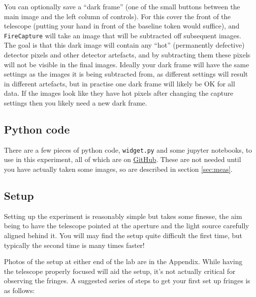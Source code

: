 \documentclass[11pt]{article}
\begin{document}
You can optionally save a ``dark frame'' (one of the small buttons between the main image and the left column of controls). For this cover the front of the telescope (putting your hand in front of the baseline token would suffice), and \texttt{FireCapture} will take an image that will be subtracted off subsequent images. The goal is that this dark image will contain any ``hot'' (permanently defective) detector pixels and other detector artefacts, and by subtracting them these pixels will not be visible in the final images. Ideally your dark frame will have the same settings as the images it is being subtracted from, as different settings will result in different artefacts, but in practise one dark frame will likely be OK for all data. If the images look like they have hot pixels after changing the capture settings then you likely need a new dark frame.

\subsection{Python code}

There are a few pieces of python code, \texttt{widget.py} and some jupyter notebooks, to use in this experiment, all of which are on \href{https://github.com/drgmk/px-interferometry}{GitHub}. These are not needed until you have actually taken some images, so are described in section \ref{sec:meas}.

\clearpage

\subsection{Setup}\label{sec:setup}

Setting up the experiment is reasonably simple but takes some finesse, the aim being to have the telescope pointed at the aperture and the light source carefully aligned behind it. You will may find the setup quite difficult the first time, but typically the second time is many times faster!

Photos of the setup at either end of the lab are in the Appendix. While having the telescope properly focused will aid the setup, it's not actually critical for observing the fringes. A suggested series of steps to get your first set up fringes is as follows:
\end{document}
